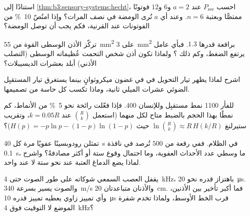 \begin{exercise}[$\star\star$]\label{exo:b3:sensory-systems:6}
استنادًا إلى \cref{thm:b3:sensory-systems:hecht}، احسب $P_{\text{see}}$ عند
$a = 2$ و$6$ و$12$ فوتونًا ممتصًّا وبعتبة $n = 6$. وعند أي
$a$ تُرى الومضة في نصف المرات؟ وإذا امتُصّ \qty{10}{\%} من
الفوتونات عند القرنية، فكم يجب أن توصل الومضة؟
\end{exercise}

\begin{exercise}[$\star\star$]\label{exo:b3:sensory-systems:7}
تركّز الأذن الوسطى القوة من \qty{55}{mm^2} على \qty{3}{mm^2}
برافعة قدرها $1.3$. فبأي عامل يرتفع الضغط، وكم ذلك
؟ ولماذا تكون أذن شخص التحمت عُظيماته الوسطى
(التصلب الأذني) أبلد بعشرات الديسيبلات؟
\end{exercise}

\begin{exercise}[$\star\star$]\label{exo:b3:sensory-systems:8}
اشرح لماذا يظهر تيار التحويل في  في غضون
ميكروثوانٍ بينما يستغرق تيار المستقبِل الضوئي عشرات
الميلي ثانية، وماذا تكسب كل حاسة من تصميمها.
\end{exercise}

\begin{exercise}[$\star\star$]\label{exo:b3:sensory-systems:9}
للفأر \num{1100} نمط مستقبِل وللإنسان $400$. فإذا فعّلت
رائحة نحو \qty{5}{\%} من الأنماط، كم نمطًا بهذا الحجم
بالضبط متاح لكل منهما (استعمل $\binom{R}{k}$ عند $k = 0.05R$،
وتقريب ستيرلنغ $\ln\binom{R}{k} \approx R\,H(k/R)$ حيث
$H(p) = -p\ln p - (1-p)\ln(1-p)$)؟
\end{exercise}

\begin{exercise}[$\star\star\star$]\label{exo:b3:sensory-systems:10}
تمثلن  رودوبسينًا عفويًا مرة كل \qty{40}{s} في
الظلام. ففي رقعة من $500$  تُرصد في نافذة \qty{0.1}{s}،
ما وسطي عدد الأحداث العفوية، وما احتمال وقوع ستة أو أكثر
مصادفةً؟ واشرح لماذا يضع الدماغ العتبة عند نحو ستة لا عند
واحد.
\end{exercise}

\begin{exercise}[$\star\star\star$]\label{exo:b3:sensory-systems:11}
يقفل العصب السمعي شوكاته على طور الصوت حتى \qty{4}{kHz}،
باهتزاز قدره نحو \qty{20}{\micro s}. والصوت يسير بسرعة
\qty{340}{m/s} والأذنان متباعدتان \qty{20}{cm}. فما أكبر
تأخير بين الأذنين، وأي تمييز زاوي يعطيه تمييز قدره
\qty{10}{\micro s} قرب الخط الأوسط، ولماذا تخدم شفرة الموضع
لا التوقيت فوق \qty{4}{kHz}؟
\end{exercise}

